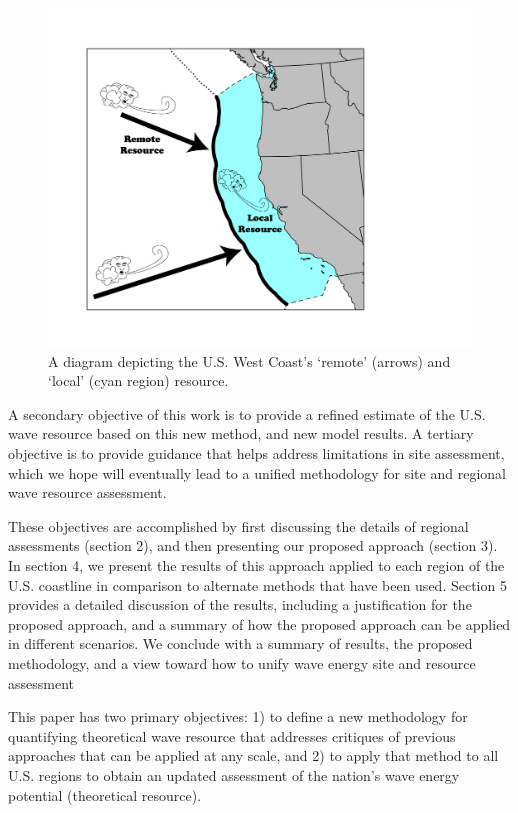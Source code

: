 \begin{figure}[ht]
  \centering
\includegraphics[width=0.9\linewidth]{../diagram/EEZ_contour03_edit01.png}
  \caption{A diagram depicting the U.S. West Coast’s ‘remote’ (arrows) and ‘local’ (cyan region) resource.}
  \label{fig:diagram:west-eez}
\end{figure}

A secondary objective of this work is to provide a refined estimate of the U.S. wave resource based on this new method, and new model results. A tertiary objective is to provide guidance that helps address limitations in site assessment, which we hope will eventually lead to a unified methodology for site and regional wave resource assessment.

These objectives are accomplished by first discussing the details of regional assessments (section 2), and then presenting our proposed approach (section 3). In section 4, we present the results of this approach applied to each region of the U.S. coastline in comparison to alternate methods that have been used. Section 5 provides a detailed discussion of the results, including a justification for the proposed approach, and a summary of how the proposed approach can be applied in different scenarios. We conclude with a summary of results, the proposed methodology, and a view toward how to unify wave energy site and resource assessment

This paper has two primary objectives: 1) to define a new methodology for quantifying theoretical wave resource that addresses critiques of previous approaches that can be applied at any scale, and 2) to apply that method to all U.S. regions to obtain an updated assessment of the nation's wave energy potential (theoretical resource).


